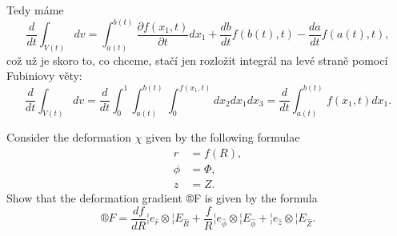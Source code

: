 \documentclass[12pt]{article}					%
\begin{document}
\begin{dukaz}
		Tedy máme
		$$ \frac{d}{dt}\int_{V(t)} dv = \int_{a(t)}^{b(t)} \frac{\partial f(x_1, t)}{\partial t} dx_1 + \frac{db}{dt} f(b(t), t) - \frac{da}{dt} f(a(t), t), $$
		což už je skoro to, co chceme, stačí jen rozložit integrál na levé straně pomocí Fubiniovy věty:
		$$ \frac{d}{dt}\int_{V(t)} dv = \frac{d}{dt}\int_0^1 \int_{a(t)}^{b(t)} \int_0^{f(x_1, t)} dx_2 dx_1 dx_3 = \frac{d}{dt}\int_{a(t)}^{b(t)} f(x_1, t) dx_1. $$
	\end{dukaz}

\begin{priklad}
	Consider the deformation $\chi$ given by the following formulae
		\begin{align*}
			r &= f(R),\\
			\phi &= \Phi,\\
			z &= Z.
		\end{align*}
	Show that the deformation gradient ®F is given by the formula
	$$ ®F = \frac{df}{dR} ¦e_{\hat{r}} \otimes ¦E_{\hat{R}} + \frac{f}{R} ¦e_{\hat{\phi}} \otimes ¦E_{\hat{\phi}} + ¦e_{\hat{z}} \otimes ¦E_{\hat{Z}}. $$
\end{priklad}
\end{document}
